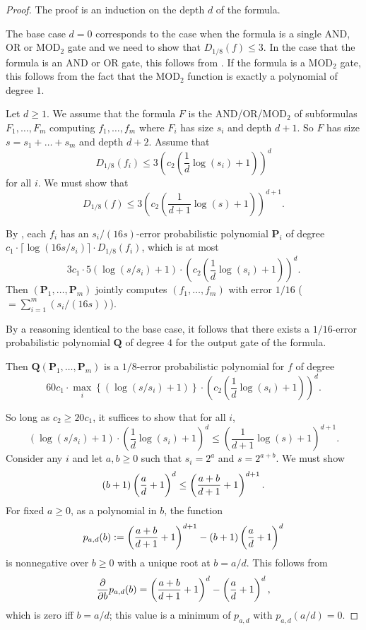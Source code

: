 \documentclass{toc}
\newcommand{\mb}{\mathbf}
\begin{document}
\begin{proof}
The proof is an induction on the depth $d$ of the formula. 

The base case $d=0$ corresponds to the case when the formula is a single AND, OR or MOD$_2$  gate and we need to show that $D_{1/8}(f)\leq 3$. In the case that the formula is an AND or OR gate, this follows from . If the formula is a MOD$_2$  gate, this follows from the fact that the MOD$_2$  function is exactly a polynomial of degree $1$. 

Let $d\ge 1$. We assume that the formula $F$ is the AND/OR/MOD$_2$  of
%
subformulas   %
$F_1,\ldots,F_m$ computing $f_1,\dots,f_m$ where $F_i$ has size $s_i$ and depth $d+1$. So $F$ has size $s = s_1+\dots+s_m$ and depth $d+2$. Assume that
\[
  D_{1/8}(f_i) \le 3\left(c_2\left(\frac{1}{d}\log(s_i)+1\right)\right)^d
\]
for all $i$. We must show that
\[
  D_{1/8}(f) \le 3\left(c_2\left(\frac{1}{d+1}\log(s)+1\right)\right)^{d+1}.
\]

By , each $f_i$ has an $s_i/(16s)$-error probabilistic polynomial $\mb P_i$ of degree $c_1\cdot\lceil\log(16s/s_i)\rceil\cdot D_{1/8}(f_i)$, which is at most
\[
  3c_1 \cdot 5(\log(s/s_i)+1)\cdot \left(c_2\left(\frac{1}{d}\log(s_i)+1\right)\right)^d.
\]
Then $(\mb P_1,\dots,\mb P_m)$ jointly computes $(f_1,\dots,f_m)$ with error $1/16$ ($= \sum_{i=1}^m (s_i/(16 s))$). 

By a reasoning identical to the base case, it follows that there exists a $1/16$-error probabilistic polynomial $\mb Q$ of degree $4$ for the output gate of the formula. 

Then $\mb Q(\mb P_1,\dots,\mb P_m)$ is a $1/8$-error probabilistic polynomial for $f$ of degree
\[
  60c_1\cdot\max_i\left\{ (\log(s/s_i)+1)\right\} \cdot \left(c_2\left(\frac{1}{d}\log(s_i)+1\right)\right)^d.
\]

So long as $c_2 \ge 20c_1$, it suffices to show that for all $i$,
\[
  (\log(s/s_i)+1) \cdot \left(\frac{1}{d}\log(s_i)+1\right)^d
  \le
  \left(\frac{1}{d+1}\log(s)+1\right)^{d+1}.
\]
Consider any $i$ and let $a,b \ge 0$ such that $s_i = 2^a$ and $s = 2^{a+b}$. We must show
\[
  (b+1)\left(\frac{a\vphantom{b}}{d}+1\right)^d
  \le
  \left(\frac{a+b}{d+1}+1\right)^{d+1}.
\]
For fixed $a \ge 0$, as a polynomial in $b$, the function
\[
  p_{a,d}(b) := \left(\frac{a+b}{d+1}+1\right)^{d+1} - (b+1)\left(\frac{a\vphantom{b}}{d}+1\right)^d
\]
is nonnegative over $b \ge 0$ with a unique root at $b = a/d$. This follows from
\[
  \frac{\partial}{\partial b} p_{a,d}(b) = 
  \left(\frac{a+b}{d+1}+1\right)^d - \left(\frac{a\vphantom{b}}{d}+1\right)^d,
\]
which is zero iff $b = a/d$; this value is a minimum of $p_{a,d}$ with $p_{a,d}(a/d) = 0$.
\end{proof}
\end{document}
